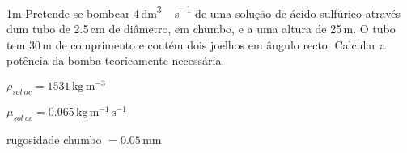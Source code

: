 \documentclass[\mainfilename]{subfiles}
\begin{document}
\begin{questionBox}1m{ %
    Pretende-se bombear 4\,\si{\deci\metre^3\,\second^{-1}} de uma solução de ácido sulfúrico através dum tubo de 2.5\,\si{\centi\metre} de diâmetro, em chumbo, e a uma altura de 25\,\si{\metre}. O tubo tem 30\,\si{\metre} de comprimento e contém dois joelhos em ângulo recto. Calcular a potência da bomba teoricamente necessária.
} %
    
    \begin{itemize}
        \begin{multicols}{2}
            \item \( \rho_{sol\ ac}=1531\,\si{\kilo\gram\,\metre^{-3}}\)
            \item \( \mu_{sol\ ac} = 0.065\,\si{\kilo\gram\,\metre^{-1}\,\second^{-1}}\)
            \item rugosidade chumbo \(= 0.05\,\si{\milli\metre}\)
        \end{multicols}
    \end{itemize}


\end{questionBox}
\end{document}
